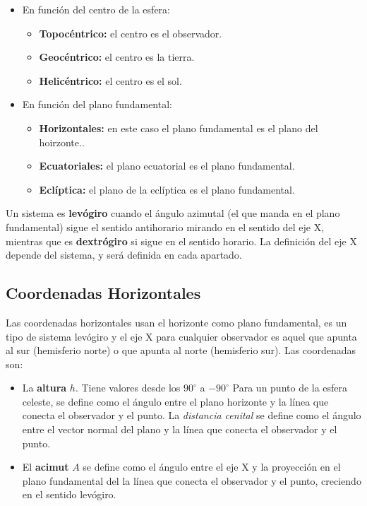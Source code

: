 \begin{itemize}
	\item En función del centro de la esfera: \begin{itemize}
		\item \textbf{Topocéntrico:} el centro es el observador.
		\item \textbf{Geocéntrico:} el centro es la tierra.
		\item \textbf{Helicéntrico:} el centro es el sol.
	\end{itemize}
	\item En función del plano fundamental: \begin{itemize}
	\item \textbf{Horizontales:} en este caso el plano fundamental es el {plano del hoirzonte.}.
	\item \textbf{Ecuatoriales:} el plano ecuatorial es el plano fundamental.
	\item \textbf{Eclíptica:} el plano de la eclíptica es el plano fundamental.
	\end{itemize}
\end{itemize}
Un sistema es \textbf{levógiro} cuando el ángulo azimutal (el que manda en el plano fundamental) sigue el sentido antihorario mirando en el sentido del eje X, mientras que es \textbf{dextrógiro} si sigue en el sentido horario. La definición del eje X depende del sistema, y será definida en cada apartado. 

\subsection{Coordenadas Horizontales}

Las coordenadas horizontales usan el horizonte como plano fundamental, es un tipo de sistema levógiro y el eje X para cualquier observador es aquel que apunta al sur (hemisferio norte) o que apunta al norte (hemisferio sur). Las coordenadas son:

\begin{itemize}
	\item La \textbf{altura} $h$. Tiene valores desde los $90^\circ$ a $-90^\circ$ Para un punto de la esfera celeste, se define como el ángulo entre el plano horizonte y la línea que conecta el observador y el punto. La \textit{distancia cenital} se define como el ángulo entre el vector normal del plano y la línea que conecta el observador y el punto.
	\item El \textbf{acimut} $A$ se define como el ángulo entre el eje X y la proyección en el plano fundamental del la línea que conecta el observador y el punto, creciendo en el sentido levógiro. 
\end{itemize}

